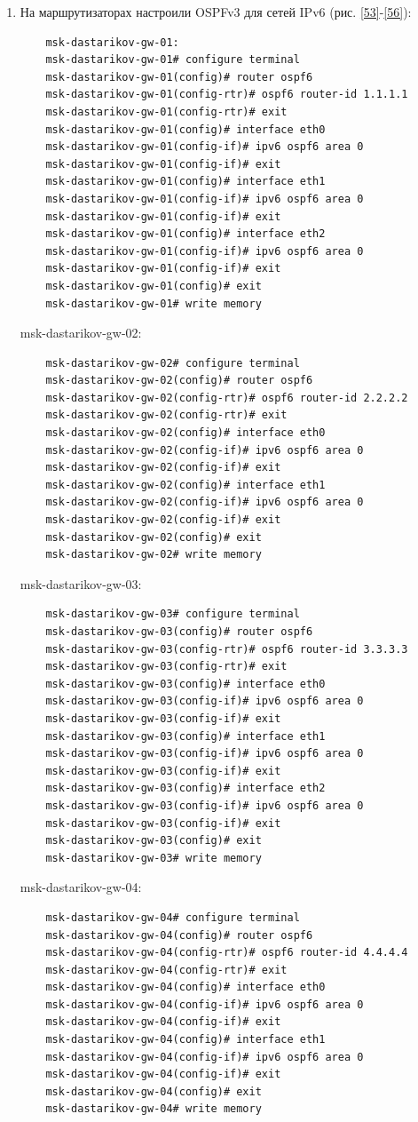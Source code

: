 \begin{enumerate}
  \item На маршрутизаторах настроили OSPFv3 для сетей IPv6 (рис. \ref{53}-\ref{56}):
\begin{verbatim}
    msk-dastarikov-gw-01:
    msk-dastarikov-gw-01# configure terminal
    msk-dastarikov-gw-01(config)# router ospf6
    msk-dastarikov-gw-01(config-rtr)# ospf6 router-id 1.1.1.1
    msk-dastarikov-gw-01(config-rtr)# exit
    msk-dastarikov-gw-01(config)# interface eth0
    msk-dastarikov-gw-01(config-if)# ipv6 ospf6 area 0
    msk-dastarikov-gw-01(config-if)# exit
    msk-dastarikov-gw-01(config)# interface eth1
    msk-dastarikov-gw-01(config-if)# ipv6 ospf6 area 0
    msk-dastarikov-gw-01(config-if)# exit
    msk-dastarikov-gw-01(config)# interface eth2
    msk-dastarikov-gw-01(config-if)# ipv6 ospf6 area 0
    msk-dastarikov-gw-01(config-if)# exit
    msk-dastarikov-gw-01(config)# exit
    msk-dastarikov-gw-01# write memory
\end{verbatim}
    msk-dastarikov-gw-02:
\begin{verbatim}
    msk-dastarikov-gw-02# configure terminal
    msk-dastarikov-gw-02(config)# router ospf6
    msk-dastarikov-gw-02(config-rtr)# ospf6 router-id 2.2.2.2
    msk-dastarikov-gw-02(config-rtr)# exit
    msk-dastarikov-gw-02(config)# interface eth0
    msk-dastarikov-gw-02(config-if)# ipv6 ospf6 area 0
    msk-dastarikov-gw-02(config-if)# exit
    msk-dastarikov-gw-02(config)# interface eth1
    msk-dastarikov-gw-02(config-if)# ipv6 ospf6 area 0
    msk-dastarikov-gw-02(config-if)# exit
    msk-dastarikov-gw-02(config)# exit
    msk-dastarikov-gw-02# write memory
\end{verbatim}
    msk-dastarikov-gw-03:
\begin{verbatim}
    msk-dastarikov-gw-03# configure terminal
    msk-dastarikov-gw-03(config)# router ospf6
    msk-dastarikov-gw-03(config-rtr)# ospf6 router-id 3.3.3.3
    msk-dastarikov-gw-03(config-rtr)# exit
    msk-dastarikov-gw-03(config)# interface eth0
    msk-dastarikov-gw-03(config-if)# ipv6 ospf6 area 0
    msk-dastarikov-gw-03(config-if)# exit
    msk-dastarikov-gw-03(config)# interface eth1
    msk-dastarikov-gw-03(config-if)# ipv6 ospf6 area 0
    msk-dastarikov-gw-03(config-if)# exit
    msk-dastarikov-gw-03(config)# interface eth2
    msk-dastarikov-gw-03(config-if)# ipv6 ospf6 area 0
    msk-dastarikov-gw-03(config-if)# exit
    msk-dastarikov-gw-03(config)# exit
    msk-dastarikov-gw-03# write memory
\end{verbatim}
    msk-dastarikov-gw-04:
\begin{verbatim}
    msk-dastarikov-gw-04# configure terminal
    msk-dastarikov-gw-04(config)# router ospf6
    msk-dastarikov-gw-04(config-rtr)# ospf6 router-id 4.4.4.4
    msk-dastarikov-gw-04(config-rtr)# exit
    msk-dastarikov-gw-04(config)# interface eth0
    msk-dastarikov-gw-04(config-if)# ipv6 ospf6 area 0
    msk-dastarikov-gw-04(config-if)# exit
    msk-dastarikov-gw-04(config)# interface eth1
    msk-dastarikov-gw-04(config-if)# ipv6 ospf6 area 0
    msk-dastarikov-gw-04(config-if)# exit
    msk-dastarikov-gw-04(config)# exit
    msk-dastarikov-gw-04# write memory
\end{verbatim}


\end{enumerate}
